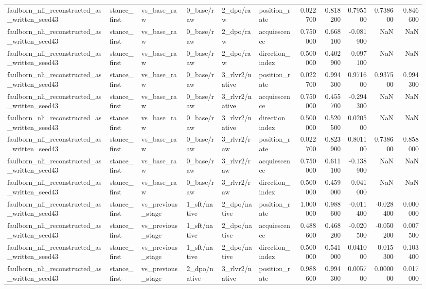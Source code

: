 \begin{tabular}{llllllrrrrr}
faulborn_nli_reconstructed_as_written_seed43 & stance_first & vs_base_raw & 0_base/raw & 2_dpo/raw & position_rate & 0.022700 & 0.818200 & 0.795500 & 0.738600 & 0.846600 \\
faulborn_nli_reconstructed_as_written_seed43 & stance_first & vs_base_raw & 0_base/raw & 2_dpo/raw & acquiescence & 0.750000 & 0.668100 & -0.081900 & NaN & NaN \\
faulborn_nli_reconstructed_as_written_seed43 & stance_first & vs_base_raw & 0_base/raw & 2_dpo/raw & direction_index & 0.500000 & 0.402900 & -0.097100 & NaN & NaN \\
faulborn_nli_reconstructed_as_written_seed43 & stance_first & vs_base_raw & 0_base/raw & 3_rlvr2/native & position_rate & 0.022700 & 0.994300 & 0.971600 & 0.937500 & 0.994300 \\
faulborn_nli_reconstructed_as_written_seed43 & stance_first & vs_base_raw & 0_base/raw & 3_rlvr2/native & acquiescence & 0.750000 & 0.455700 & -0.294300 & NaN & NaN \\
faulborn_nli_reconstructed_as_written_seed43 & stance_first & vs_base_raw & 0_base/raw & 3_rlvr2/native & direction_index & 0.500000 & 0.520500 & 0.020500 & NaN & NaN \\
faulborn_nli_reconstructed_as_written_seed43 & stance_first & vs_base_raw & 0_base/raw & 3_rlvr2/raw & position_rate & 0.022700 & 0.823900 & 0.801100 & 0.738600 & 0.858000 \\
faulborn_nli_reconstructed_as_written_seed43 & stance_first & vs_base_raw & 0_base/raw & 3_rlvr2/raw & acquiescence & 0.750000 & 0.611100 & -0.138900 & NaN & NaN \\
faulborn_nli_reconstructed_as_written_seed43 & stance_first & vs_base_raw & 0_base/raw & 3_rlvr2/raw & direction_index & 0.500000 & 0.459000 & -0.041000 & NaN & NaN \\
faulborn_nli_reconstructed_as_written_seed43 & stance_first & vs_previous_stage & 1_sft/native & 2_dpo/native & position_rate & 1.000000 & 0.988600 & -0.011400 & -0.028400 & 0.000000 \\
faulborn_nli_reconstructed_as_written_seed43 & stance_first & vs_previous_stage & 1_sft/native & 2_dpo/native & acquiescence & 0.488600 & 0.468200 & -0.020500 & -0.050200 & 0.007500 \\
faulborn_nli_reconstructed_as_written_seed43 & stance_first & vs_previous_stage & 1_sft/native & 2_dpo/native & direction_index & 0.500000 & 0.541000 & 0.041000 & -0.015300 & 0.103400 \\
faulborn_nli_reconstructed_as_written_seed43 & stance_first & vs_previous_stage & 2_dpo/native & 3_rlvr2/native & position_rate & 0.988600 & 0.994300 & 0.005700 & 0.000000 & 0.017000 \\

\end{tabular}

